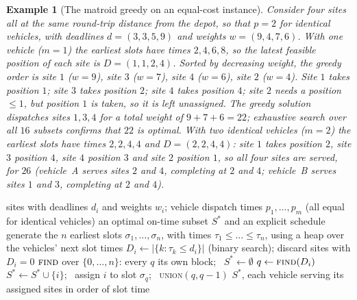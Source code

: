 \documentclass[pdflatex,sn-mathphys-ay]{sn-jnl}
\theoremstyle{thmstyleone}
\theoremstyle{thmstyletwo}
\theoremstyle{thmstylethree}
\newtheorem{example}{Example}
\begin{document}
\begin{example}[The matroid greedy on an equal-cost instance]\label{ex:matroid}
Consider four sites all at the same round-trip distance from the depot,
so that $p=2$ for identical vehicles, with deadlines $d=(3,3,5,9)$ and
weights $w=(9,4,7,6)$. With one vehicle ($m=1$) the earliest slots have
times $2,4,6,8$, so the latest feasible position of each site is $D=(1,1,2,4)$.
Sorted by decreasing weight, the greedy order is site $1$ ($w=9$), site
$3$ ($w=7$), site $4$ ($w=6$), site $2$ ($w=4$). Site $1$ takes position
$1$; site $3$ takes position $2$; site $4$ takes position $4$; site $2$
needs a position $\le 1$, but position $1$ is taken, so it is left
unassigned. The greedy solution dispatches sites $1,3,4$ for a total
weight of $9+7+6=22$; exhaustive search over all $16$ subsets confirms
that $22$ is optimal. With two identical vehicles ($m=2$) the earliest
slots have times $2,2,4,4$ and $D=(2,2,4,4)$: site $1$ takes position $2$,
site $3$ position $4$, site $4$ position $3$ and site $2$ position $1$, so
all four sites are served, for $26$ (vehicle~A serves sites $2$ and $4$,
completing at $2$ and $4$; vehicle~B serves sites $1$ and $3$, completing
at $2$ and $4$).
\end{example}

\begin{algorithm}
\caption{Matroid greedy for equal-size MWHED-$m$ (Theorem~\ref{thm:equalp})}\label{alg:matroid}
\begin{algorithmic}[1]
\Require sites with deadlines $d_i$ and weights $w_i$; vehicle dispatch times $p_1,\dots,p_m$ (all equal for identical vehicles)
\Ensure an optimal on-time subset $S^\ast$ and an explicit schedule
\State generate the $n$ earliest slots $\sigma_1,\dots,\sigma_n$, with times $\tau_1\le\dots\le\tau_n$, using a heap over the vehicles' next slot times
\State $D_i\gets|\{k:\tau_k\le d_i\}|$ (binary search); discard sites with $D_i=0$
\State $\textsc{find}$ over $\{0,\dots,n\}$: every $q$ its own block; \ $S^\ast\gets\emptyset$
  \State $q \gets \textsc{find}(D_i)$ 
    \State $S^\ast\gets S^\ast\cup\{i\}$; \ assign $i$ to slot $\sigma_q$; \ \textsc{union}$(q,q-1)$ 
  \EndIf
\EndFor
\State \Return $S^\ast$, each vehicle serving its assigned sites in order of slot time
\end{algorithmic}
\end{algorithm}
\end{document}
